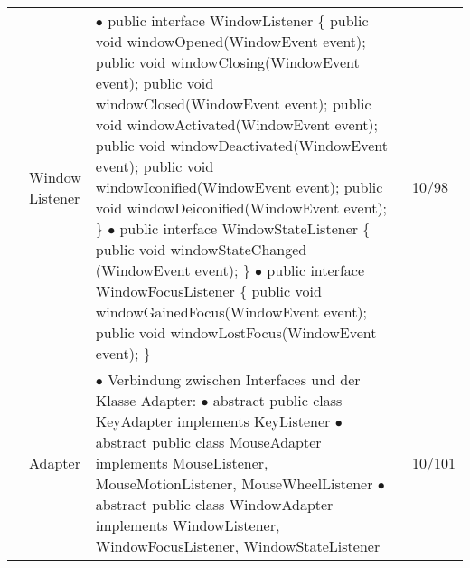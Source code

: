 \documentclass[11pt,a4paper]{article}
\begin{document}
\begin{center}
\begin{longtable}[h]{ | p{2.3cm} | p{2.3cm} | p{12.6cm} | p{1.2cm} | }
	& \makecell[l]{Window\\ Listener} & \makecell[l]{$\bullet$ public interface WindowListener \{ \\
	\hspace{1cm} public void windowOpened(WindowEvent event); \\
	\hspace{1cm} public void windowClosing(WindowEvent event);  \\
	\hspace{1cm} public void windowClosed(WindowEvent event);  \\
	\hspace{1cm} public void windowActivated(WindowEvent event);  \\
	\hspace{1cm} public void windowDeactivated(WindowEvent event);  \\
	\hspace{1cm} public void windowIconified(WindowEvent event);  \\
	\hspace{1cm} public void windowDeiconified(WindowEvent event); \} \\
	$\bullet$ public interface WindowStateListener \{ \\
	\hspace{1cm} public void windowStateChanged (WindowEvent event); \} \\
	$\bullet$ public interface WindowFocusListener \{ \\
	\hspace{1cm} public void windowGainedFocus(WindowEvent event);\\
	\hspace{1cm} public void windowLostFocus(WindowEvent event); \} \\
	 }  & 10/98 \\ \cline{2-4}
	 
	
	& Adapter & \makecell[l]{$\bullet$ Verbindung zwischen Interfaces und der Klasse Adapter:\\
	$\bullet$ abstract public class KeyAdapter implements KeyListener \\
	$\bullet$ abstract public class MouseAdapter implements MouseListener,\\
	\hspace{2cm} MouseMotionListener, MouseWheelListener \\
	$\bullet$ abstract public class WindowAdapter implements WindowListener, \\
	\hspace{2cm} WindowFocusListener, WindowStateListener }  & 10/101 \\ \cline{2-4}
	

\end{longtable}
\end{center}
\end{document}
